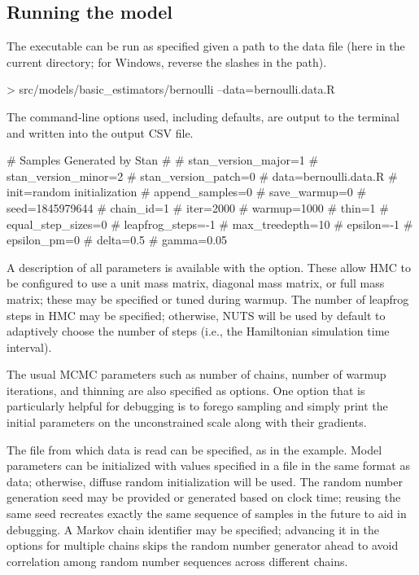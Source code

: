 \documentclass[article]{jss}
\begin{document}
\subsection{Running the model}

The executable can be run as specified given a path to the data file
(here  in the current directory; for
Windows, reverse the slashes in the path).
%
\begin{CodeChunk}
\begin{CodeInput}
> src/models/basic_estimators/bernoulli --data=bernoulli.data.R
\end{CodeInput}
\end{CodeChunk}
%
The command-line options used, including defaults, are output to the
terminal and written into the output CSV file.
%
\begin{Code}
# Samples Generated by Stan
#
# stan_version_major=1
# stan_version_minor=2
# stan_version_patch=0
# data=bernoulli.data.R
# init=random initialization
# append_samples=0
# save_warmup=0
# seed=1845979644
# chain_id=1
# iter=2000
# warmup=1000
# thin=1
# equal_step_sizes=0
# leapfrog_steps=-1
# max_treedepth=10
# epsilon=-1
# epsilon_pm=0
# delta=0.5
# gamma=0.05
\end{Code}
%
A description of all parameters is available with the 
option.  These allow HMC to be configured to use a unit mass matrix,
diagonal mass matrix, or full mass matrix; these may be specified or
tuned during warmup. The number of leapfrog steps in HMC may be
specified; otherwise, NUTS will be used by default to adaptively
choose the number of steps (i.e., the Hamiltonian simulation time
interval).

The usual MCMC parameters such as number of chains, number of warmup
iterations, and thinning are also specified as options.  One option
that is particularly helpful for debugging is to forego sampling and
simply print the initial parameters on the unconstrained scale along
with their gradients.  

The file from which data is read can be specified, as in the example.
Model parameters can be initialized with values specified in a file in
the same format as data; otherwise, diffuse random initialization will
be used.  The random number generation seed may be provided or
generated based on clock time; reusing the same seed recreates exactly
the same sequence of samples in the future to aid in debugging.  A
Markov chain identifier may be specified; advancing it in the options
for multiple chains skips the random number generator ahead to avoid
correlation among random number sequences across different chains.
\end{document}
